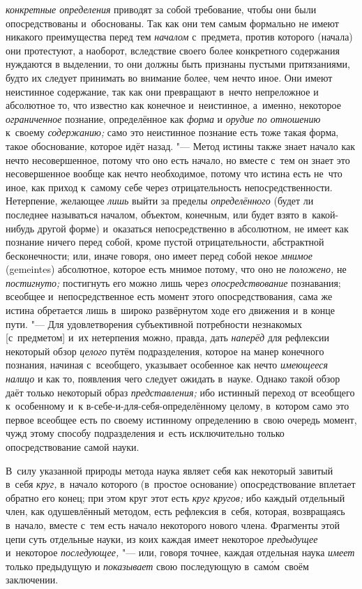 {\em конкретные определения}
приводят за собой требование, чтобы они были опосредствованы
и~обоснованы. Так как они тем самым формально не имеют никакого
преимущества перед тем {\em началом}
с~предмета, против которого (начала) они протестуют, а
наоборот, вследствие своего более конкретного содержания нуждаются в
выделении, то они должны быть признаны пустыми притязаниями, будто их
следует принимать во внимание более, чем нечто иное. Они имеют
неистинное содержание, так как они превращают в~нечто непреложное и
абсолютное то, что известно как конечное и~неистинное, а~именно, некоторое
{\em ограниченное} познание, определённое как {\em форма} и {\em орудие}
{\em по отношению} к~своему {\em содержанию;}
само это неистинное познание есть тоже такая форма, такое
обоснование, которое идёт назад. "--- Метод истины также знает
начало как нечто несовершенное, потому что оно есть начало, но вместе с~тем
он знает это несовершенное вообще как нечто необходимое,
потому что истина есть не~что иное, как приход к~самому себе через
отрицательность непосредственности. Нетерпение, желающее
{\em лишь} выйти за пределы {\em определённого}
(будет ли последнее называться началом, объектом, конечным,
или будет взято в~какой-нибудь другой форме) и~оказаться непосредственно в
абсолютном, не имеет как познание ничего перед собой, кроме пустой
отрицательности, абстрактной бесконечности; или, иначе говоря, оно имеет
перед собой некое {\em мнимое} (gemeintes) абсолютное, которое есть мнимое
потому, что оно не {\em положено,} не {\em постигнуто;}
постигнуть его можно лишь через {\em опосредствование}
познавания; всеобщее и~непосредственное есть момент этого
опосредствования, сама же истина обретается лишь в~широко развёрнутом ходе
его движения и~в конце пути. "--- Для удовлетворения
субъективной потребности незнакомых [с~предметом] и~их нетерпения можно,
правда, дать {\em наперёд} для рефлексии некоторый обзор {\em целого} путём
подразделения, которое на манер конечного познания, начиная с~всеобщего,
указывает особенное как нечто {\em имеющееся налицо} и
как то, появления чего следует ожидать в~науке. Однако такой обзор даёт
только некоторый образ {\em представления;} ибо
истинный переход от всеобщего к~особенному и~к
в-себе-и-для-себя-определённому целому, в~котором само это первое всеобщее
есть по своему истинному определению в~свою очередь момент, чужд этому
способу подразделения и~есть исключительно только опосредствование самой науки.

В~силу указанной природы метода наука являет себя как некоторый завитый в~себя
{\em круг,} в~начало которого (в~простое основание) опосредствование вплетает
обратно его конец; при этом круг этот есть {\em круг кругов;} ибо каждый
отдельный член, как одушевлённый методом, есть рефлексия в~себя, которая,
возвращаясь в~начало, вместе с~тем есть начало некоторого нового члена.
Фрагменты этой цепи суть отдельные науки, из коих каждая имеет некоторое
{\em предыдущее} и~некоторое {\em последующее,} "--- или, говоря точнее,
каждая отдельная наука {\em имеет} только предыдущую и {\em показывает}
свою последующую в~сам\'{о}м~своём заключении.


